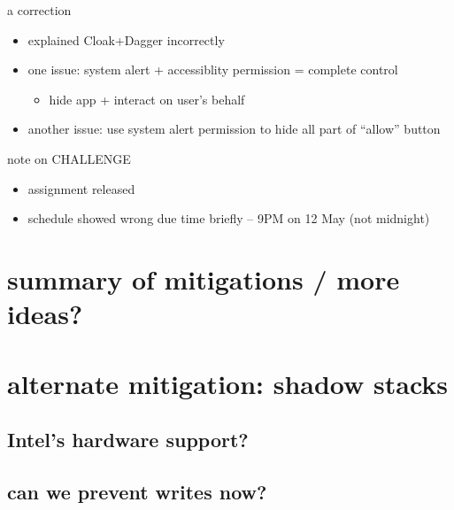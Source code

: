 \begin{frame}{a correction}
    \begin{itemize}
    \item explained Cloak+Dagger incorrectly
    \vspace{.5cm}
    \item one issue: system alert + accessiblity permission = complete control
        \begin{itemize}
        \item hide app + interact on user's behalf
        \end{itemize}
    \item another issue: use system alert permission to hide all part of ``allow'' button
    \end{itemize}
\end{frame}

\begin{frame}{note on CHALLENGE}
    \begin{itemize}
    \item assignment released
    \item schedule showed wrong due time briefly -- 9PM on 12 May (not midnight)
    \end{itemize}
\end{frame}



\section{summary of mitigations / more ideas?}


\section{alternate mitigation: shadow stacks}


\subsection{Intel's hardware support?}


\subsection{can we prevent writes now?}


